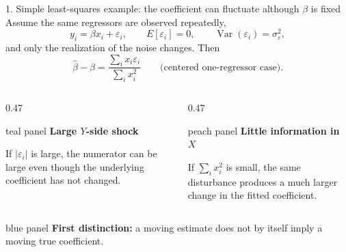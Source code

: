 \documentclass[aspectratio=169,10pt]{beamer}
\newenvironment{tealpanel}{\begin{beamercolorbox}[wd=\linewidth,sep=0.16cm,rounded=true]{teal panel}}{\end{beamercolorbox}}
\newenvironment{peachpanel}{\begin{beamercolorbox}[wd=\linewidth,sep=0.16cm,rounded=true]{peach panel}}{\end{beamercolorbox}}
\newenvironment{bluepanel}{\begin{beamercolorbox}[wd=\linewidth,sep=0.16cm,rounded=true]{blue panel}}{\end{beamercolorbox}}
\begin{document}
\begin{frame}{1. Simple least-squares example: the coefficient can fluctuate although $\beta$ is fixed}
\small
Assume the same regressors are observed repeatedly,
\[
 y_i=\beta x_i+\varepsilon_i,\qquad E[\varepsilon_i]=0,\qquad \operatorname{Var}(\varepsilon_i)=\sigma_\varepsilon^2,
\]
and only the realization of the noise changes. Then
\[
\boxed{\hat\beta-\beta=\frac{\sum_i x_i\varepsilon_i}{\sum_i x_i^2}}
\qquad\text{(centered one-regressor case).}
\]

\begin{columns}[T,onlytextwidth]
\begin{column}{0.47\textwidth}
\begin{tealpanel}
\textbf{Large $Y$-side shock}

If $|\varepsilon_i|$ is large, the numerator can be large even though the underlying coefficient has not changed.
\end{tealpanel}
\end{column}
\begin{column}{0.47\textwidth}
\begin{peachpanel}
\textbf{Little information in $X$}

If $\sum_i x_i^2$ is small, the same disturbance produces a much larger change in the fitted coefficient.
\end{peachpanel}
\end{column}
\end{columns}

\vspace{0.14cm}
\begin{bluepanel}
\centering
\textbf{First distinction:} a moving estimate does not by itself imply a moving true coefficient.
\end{bluepanel}
\end{frame}
\end{document}
